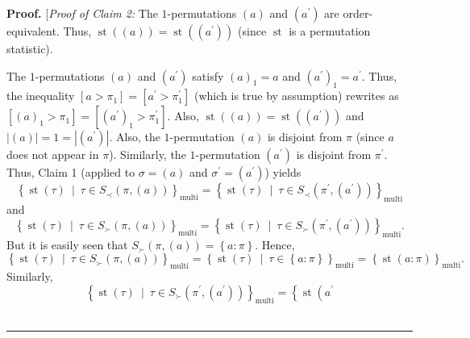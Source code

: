 \documentclass[numbers=enddot,12pt,final,onecolumn,notitlepage]{scrartcl}%
\theoremstyle{definition}
\newenvironment{proof}[1][Proof]{\noindent\textbf{#1.} }{\ \rule{0.5em}{0.5em}}
\begin{document}
\begin{proof}
[\textit{Proof of Claim 2:} The $1$-permutations $\left(  a\right)  $ and
$\left(  a^{\prime}\right)  $ are order-equivalent. Thus, $\operatorname*{st}%
\left(  \left(  a\right)  \right)  =\operatorname*{st}\left(  \left(
a^{\prime}\right)  \right)  $ (since $\operatorname*{st}$ is a permutation statistic).

The $1$-permutations $\left(  a\right)  $ and $\left(  a^{\prime}\right)  $
satisfy $\left(  a\right)  _{1}=a$ and $\left(  a^{\prime}\right)
_{1}=a^{\prime}$. Thus, the inequality $\left[  a>\pi_{1}\right]  =\left[
a^{\prime}>\pi_{1}^{\prime}\right]  $ (which is true by assumption) rewrites
as $\left[  \left(  a\right)  _{1}>\pi_{1}\right]  =\left[  \left(  a^{\prime
}\right)  _{1}>\pi_{1}^{\prime}\right]  $. Also, $\operatorname*{st}\left(
\left(  a\right)  \right)  =\operatorname*{st}\left(  \left(  a^{\prime
}\right)  \right)  $ and $\left\vert \left(  a\right)  \right\vert
=1=\left\vert \left(  a^{\prime}\right)  \right\vert $. Also, the
$1$-permutation $\left(  a\right)  $ is disjoint from $\pi$ (since $a$ does
not appear in $\pi$). Similarly, the $1$-permutation $\left(  a^{\prime
}\right)  $ is disjoint from $\pi^{\prime}$. Thus, Claim 1 (applied to
$\sigma=\left(  a\right)  $ and $\sigma^{\prime}=\left(  a^{\prime}\right)  $)
yields
\[
\left\{  \operatorname*{st}\left(  \tau\right)  \ \mid\ \tau\in S_{\prec
}\left(  \pi,\left(  a\right)  \right)  \right\}  _{\operatorname*{multi}%
}=\left\{  \operatorname*{st}\left(  \tau\right)  \ \mid\ \tau\in S_{\prec
}\left(  \pi^{\prime},\left(  a^{\prime}\right)  \right)  \right\}
_{\operatorname*{multi}}%
\]
and%
\[
\left\{  \operatorname*{st}\left(  \tau\right)  \ \mid\ \tau\in S_{\succ
}\left(  \pi,\left(  a\right)  \right)  \right\}  _{\operatorname*{multi}%
}=\left\{  \operatorname*{st}\left(  \tau\right)  \ \mid\ \tau\in S_{\succ
}\left(  \pi^{\prime},\left(  a^{\prime}\right)  \right)  \right\}
_{\operatorname*{multi}}.
\]
But it is easily seen that $S_{\succ}\left(  \pi,\left(  a\right)  \right)
=\left\{  a:\pi\right\}  $. Hence,%
\[
\left\{  \operatorname*{st}\left(  \tau\right)  \ \mid\ \tau\in S_{\succ
}\left(  \pi,\left(  a\right)  \right)  \right\}  _{\operatorname*{multi}%
}=\left\{  \operatorname*{st}\left(  \tau\right)  \ \mid\ \tau\in\left\{
a:\pi\right\}  \right\}  _{\operatorname*{multi}}=\left\{  \operatorname*{st}%
\left(  a:\pi\right)  \right\}  _{\operatorname*{multi}}.
\]
Similarly,%
\[
\left\{  \operatorname*{st}\left(  \tau\right)  \ \mid\ \tau\in S_{\succ
}\left(  \pi^{\prime},\left(  a^{\prime}\right)  \right)  \right\}
_{\operatorname*{multi}}=\left\{  \operatorname*{st}\left(  a^{\prime}%
\]
\end{proof}
\end{document}
